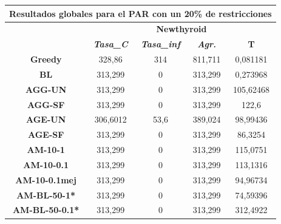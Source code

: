 \documentclass[12pt, spanish]{article}
\begin{document}
\begin{table}[H]
\centering
\begin{tabular}{|c|c|c|c|c|}
\hline
\multicolumn{5}{|c|}{\textbf{Resultados globales para el PAR con un 20\% de restricciones}}                                 \\ \hline
\multirow{2}{*}{}           & \multicolumn{4}{c|}{\textbf{Newthyroid}}                                                      \\ \cline{2-5} 
                            & \textit{\textbf{Tasa\_C}} & \textit{\textbf{Tasa\_inf}} & \textit{\textbf{Agr.}} & \textbf{T} \\ \hline
\textbf{Greedy}             & 328,86                    & 314                         & 811,711                & 0,081181   \\ \hline
\textbf{BL}                 & 313,299                   & 0                           & 313,299                & 0,273968   \\ \hline
\textbf{AGG-UN}             & 313,299                   & 0                           & 313,299                & 105,62468  \\ \hline
\textbf{AGG-SF}             & 313,299                   & 0                           & 313,299                & 122,6      \\ \hline
\textbf{AGE-UN}             & 306,6012                  & 53,6                        & 389,024                & 98,99436   \\ \hline
\textbf{AGE-SF}             & 313,299                   & 0                           & 313,299                & 86,3254    \\ \hline
\textbf{AM-10-1}            & 313,299                   & 0                           & 313,299                & 115,0751   \\ \hline
\textbf{AM-10-0.1}          & 313,299                   & 0                           & 313,299                & 113,1316   \\ \hline
\textbf{AM-10-0.1mej}       & 313,299                   & 0                           & 313,299                & 94,96734   \\ \hline
\textbf{AM-BL-50-1*}        & 313,299                   & 0                           & 313,299                & 74,59396   \\ \hline
\textbf{AM-BL-50-0.1*}      & 313,299                   & 0                           & 313,299                & 312,4922   \\ \hline

\end{tabular}
\end{table}
\end{document}
